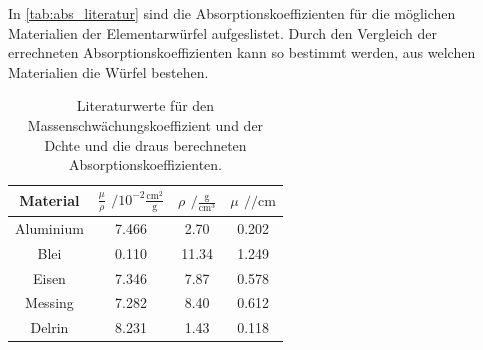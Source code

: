 In \autoref{tab:abs_literatur} sind die Absorptionskoeffizienten für die möglichen Materialien der Elementarwürfel aufgeslistet.
Durch den Vergleich der errechneten Absorptionskoeffizienten kann so bestimmt werden, aus welchen Materialien die Würfel bestehen.

\begin{table}[H]
    \centering
    \caption{Literaturwerte für den Massenschwächungskoeffizient \cite{NIST2} und der Dchte \cite{Chemie.de} und die draus berechneten Absorptionskoeffizienten.}
    \label{tab:abs_literatur}
    \begin{tabular}{c S S[table-format=2.2] S}
        \toprule
       {Material}& {$\frac{\mu}{\rho}$ $/ 10^{-2}\frac{\si{\centi\meter^2}}{\si{\g}}$} & {$\rho$ $/ \frac{\si{\g}}{\si{\centi\meter^3}}$} & {$\mu$ $/ \si{\per\centi\meter}$} \\
        \midrule
        {Aluminium} & 7.466 & 2.70 & 0.202 \\
        {Blei} & 0.110 & 11.34 & 1.249\\
        {Eisen} & 7.346 & 7.87 & 0.578 \\ 
        {Messing} & 7.282 & 8.40 & 0.612 \\ 
        {Delrin} & 8.231 & 1.43 & 0.118 \\  
        \bottomrule
    \end{tabular}
  \end{table}
